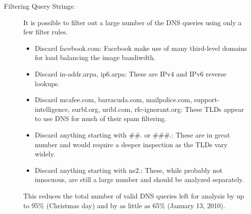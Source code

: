 \documentclass{article}
\theoremstyle{remark}
\theoremstyle{definition}
\theoremstyle{definition}
\theoremstyle{definition}
\begin{document}
\begin{description}
\item[Filtering Query Strings: ] It is possible to filter out a large number of the DNS queries using only a few filter rules.
\begin{itemize}
\item Discard facebook.com: Facebook make use of many third-level domains for load balancing the image bandiwdth.
\item Discard in-addr.arpa, ip6.arpa: These are IPv4 and IPv6 reverse lookups.
\item Discard mcafee.com, barracuda.com, mailpolice.com, support-intelligence, surbl.org, uribl.com, rfc-ignorant.org: These TLDs appear to use DNS for much of their spam filtering.
\item Discard anything starting with \#\#. or \#\#\#.: These are in great number and would require a deeper inspection as the TLDs vary widely.
\item Discard anything starting with ns2.: These, while probably not innocuous, are still a large number and should be analyzed separately.
\end{itemize}

This reduces the total number of valid DNS queries left for analysis by up to 95\% (Christmas day) and by as little as 65\% (January 13, 2010).
\end{description}
\end{document}
